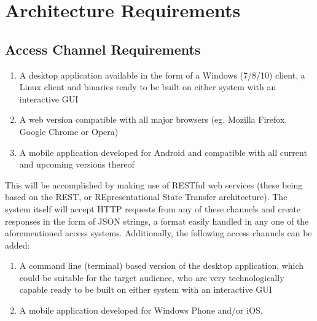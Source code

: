 \documentclass[hidelinks,a4paper,12pt]{article}
\begin{document}
	\section{Architecture Requirements}
	\subsection{Access Channel Requirements}
	\begin{enumerate}
		\item A desktop application available in the form of a Windows (7/8/10) client, a Linux client and binaries
		ready to be built on either system with an interactive GUI
		\item A web version compatible with all major browsers (eg. Mozilla Firefox, Google Chrome or Opera)
		\item A mobile application developed for Android and compatible with all current and upcoming versions thereof
	\end{enumerate}
	
	This will be accomplished by making use of RESTful web services (these being based on the REST, or REpresentational State Transfer architecture). The system itself will accept HTTP requests from any of these channels
	and create responses in the form of JSON strings, a format easily handled in any one of the aforementioned access
	systems.
	Additionally, the following access channels can be added:
	\begin{enumerate}
		\item A command line (terminal) based version of the desktop application, which could be suitable for the target
		audience, who are very technologically capable
		ready to be built on either system with an interactive GUI
		\item A mobile application developed for Windows Phone and/or iOS.
	\end{enumerate}
	
\end{document}
